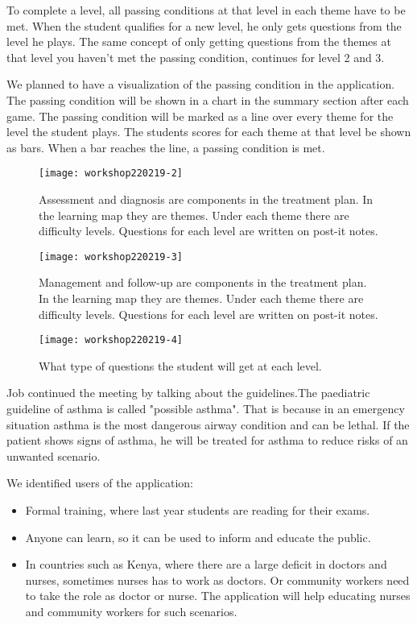 \documentclass[a4paper,12pt]{book}
\begin{document}
To complete a level, all passing conditions at that level in each theme have to be met. When the student qualifies for a new level, he only gets questions from the level he plays. The same concept of only getting questions from the themes at that level you haven't met the passing condition, continues for level 2 and 3. 

We planned to have a visualization of the passing condition in the application. The passing condition will be shown in a chart in the summary section after each game. The passing condition will be marked as a line over every theme for the level the student plays. The students scores for each theme at that level be shown as bars. When a bar reaches the line, a passing condition is met.




\begin{figure}[h]
	\caption {Assessment and diagnosis are components in the treatment plan. In the learning map they are themes. Under each theme there are difficulty levels. Questions for each level are written on post-it notes.}
	\texttt{[image: workshop220219-2]}
\end{figure}

\begin{figure}[h]
	\caption {Management and follow-up are components in the treatment plan. In the learning map they are themes. Under each theme there are difficulty levels. Questions for each level are written on post-it notes.}
	\texttt{[image: workshop220219-3]}
\end{figure}

\begin{figure}[h]
	\caption {What type of questions the student will get at each level.}
	\texttt{[image: workshop220219-4]}
\end{figure}

Job continued the meeting by talking about the guidelines.The paediatric guideline of asthma is called "possible asthma". That is because in an emergency situation asthma is the most dangerous airway condition and can be lethal. If the patient shows signs of asthma, he will be treated for asthma to reduce risks of an unwanted scenario.

We identified users of the application: 
\begin{itemize}
	\item Formal training, where last year students are reading for their exams.
	\item Anyone can learn, so it can be used to inform and educate the public.
	\item In countries such as Kenya, where there are a large deficit in doctors and nurses, sometimes nurses has to work as doctors. Or community workers need to take the role as doctor or nurse. The application will help educating nurses and community workers for such scenarios.
\end{itemize}
 
\end{document}
